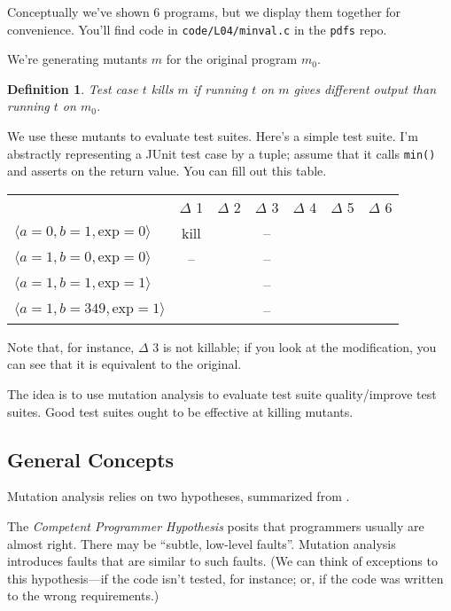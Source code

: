 \documentclass[11pt]{article}
\newtheorem{defn}{Definition}
\begin{document}
Conceptually we've shown 6 programs, but we display them together for 
convenience. You'll find code in {\tt code/L04/minval.c} in the {\tt pdfs} repo.

We're generating mutants $m$ for the original program $m_0$.
\begin{defn}
Test case $t$ \emph{kills} $m$ if running $t$ on $m$ gives different 
output than running $t$ on $m_0$.
\end{defn}

We use these mutants to evaluate test suites. Here's a simple test suite. I'm abstractly representing a JUnit test case
by a tuple; assume that it calls {\tt min()} and asserts on the return value. You can fill out this table.

\begin{center}
\begin{tabular}{lcccccc}
  & $\Delta$ 1 & $\Delta$ 2 & $\Delta$ 3 & $\Delta$ 4 & $\Delta$ 5 & $\Delta$ 6\\ 
  $\langle a = 0, b = 1, \mathrm{exp} = 0 \rangle$   & kill & & -- \\
  $\langle a = 1, b = 0, \mathrm{exp} = 0 \rangle$   & --   & & -- \\
  $\langle a = 1, b = 1, \mathrm{exp} = 1 \rangle$   &      & & -- \\
  $\langle a = 1, b = 349, \mathrm{exp} = 1 \rangle$ &      & & -- \\
\end{tabular}
\end{center}

Note that, for instance, $\Delta$ 3 is not killable; if you look at the modification,
you can see that it is equivalent to the original.

The idea is to use mutation analysis to evaluate test suite quality/improve test suites.
Good test suites ought to be effective at killing mutants.

\subsection*{General Concepts}

Mutation analysis relies on two hypotheses, summarized from \cite{delgado-perez18:_evaluat_mutat_testin_nuclear_indus_case_study}.

The \emph{Competent Programmer Hypothesis} posits that programmers usually are almost right.
There may be ``subtle, low-level faults''. Mutation analysis introduces faults that
are similar to such faults. (We can think of exceptions to this hypothesis---if
the code isn't tested, for instance; or, if the code was written to the wrong
requirements.)
\end{document}
